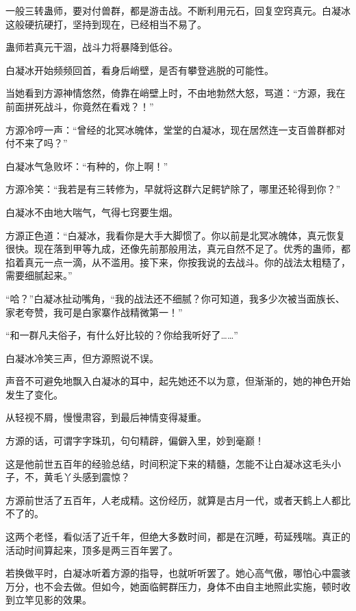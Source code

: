 
\begin{this_body}

一般三转蛊师，要对付兽群，都是游击战。不断利用元石，回复空窍真元。白凝冰这般硬抗硬打，坚持到现在，已经相当不易了。

蛊师若真元干涸，战斗力将暴降到低谷。

白凝冰开始频频回首，看身后峭壁，是否有攀登逃脱的可能性。

当她看到方源神情悠然，倚靠在峭壁上时，不由地勃然大怒，骂道：“方源，我在前面拼死战斗，你竟然在看戏？！”

方源冷哼一声：“曾经的北冥冰魄体，堂堂的白凝冰，现在居然连一支百兽群都对付不来了吗？”

白凝冰气急败坏：“有种的，你上啊！”

方源冷笑：“我若是有三转修为，早就将这群六足鳄铲除了，哪里还轮得到你？”

白凝冰不由地大喘气，气得七窍要生烟。

方源正色道：“白凝冰，我看你是大手大脚惯了。你以前是北冥冰魄体，真元恢复很快。现在落到甲等九成，还像先前那般用法，真元自然不足了。优秀的蛊师，都掐着真元一点一滴，从不滥用。接下来，你按我说的去战斗。你的战法太粗糙了，需要细腻起来。”

“哈？”白凝冰扯动嘴角，“我的战法还不细腻？你可知道，我多少次被当面族长、家老夸赞，我可是白家寨作战精微第一！”

“和一群凡夫俗子，有什么好比较的？你给我听好了……”

白凝冰冷笑三声，但方源照说不误。

声音不可避免地飘入白凝冰的耳中，起先她还不以为意，但渐渐的，她的神色开始发生了变化。

从轻视不屑，慢慢肃容，到最后神情变得凝重。

方源的话，可谓字字珠玑，句句精辟，偏僻入里，妙到毫巅！

这是他前世五百年的经验总结，时间积淀下来的精髓，怎能不让白凝冰这毛头小子，不，黄毛丫头感到震惊？

方源前世活了五百年，人老成精。这份经历，就算是古月一代，或者天鹤上人都比不了的。

这两个老怪，看似活了近千年，但绝大多数时间，都是在沉睡，苟延残喘。真正的活动时间算起来，顶多是两三百年罢了。

若换做平时，白凝冰听着方源的指导，也就听听罢了。她心高气傲，哪怕心中震骇万分，也不会去做。但如今，她面临鳄群压力，身体不由自主地照此实施，顿时收到立竿见影的效果。


\end{this_body}

